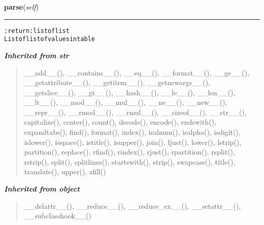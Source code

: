     \label{hal:internet:parser:HtmlTable:parse}

    \vspace{0.5ex}

\hspace{.8\funcindent}\begin{boxedminipage}{\funcwidth}

    \raggedright \textbf{parse}(\textit{self})

    \vspace{-1.5ex}

    \rule{\textwidth}{0.5\fboxrule}
\setlength{\parskip}{2ex}
\begin{alltt}

:return: list of list
    List of list of values in table
\end{alltt}

\setlength{\parskip}{1ex}
    \end{boxedminipage}


\large{\textbf{\textit{Inherited from str}}}

\begin{quote}
\_\_add\_\_(), \_\_contains\_\_(), \_\_eq\_\_(), \_\_format\_\_(), \_\_ge\_\_(), \_\_getattribute\_\_(), \_\_getitem\_\_(), \_\_getnewargs\_\_(), \_\_getslice\_\_(), \_\_gt\_\_(), \_\_hash\_\_(), \_\_le\_\_(), \_\_len\_\_(), \_\_lt\_\_(), \_\_mod\_\_(), \_\_mul\_\_(), \_\_ne\_\_(), \_\_new\_\_(), \_\_repr\_\_(), \_\_rmod\_\_(), \_\_rmul\_\_(), \_\_sizeof\_\_(), \_\_str\_\_(), capitalize(), center(), count(), decode(), encode(), endswith(), expandtabs(), find(), format(), index(), isalnum(), isalpha(), isdigit(), islower(), isspace(), istitle(), isupper(), join(), ljust(), lower(), lstrip(), partition(), replace(), rfind(), rindex(), rjust(), rpartition(), rsplit(), rstrip(), split(), splitlines(), startswith(), strip(), swapcase(), title(), translate(), upper(), zfill()
\end{quote}

\large{\textbf{\textit{Inherited from object}}}

\begin{quote}
\_\_delattr\_\_(), \_\_reduce\_\_(), \_\_reduce\_ex\_\_(), \_\_setattr\_\_(), \_\_subclasshook\_\_()
\end{quote}


